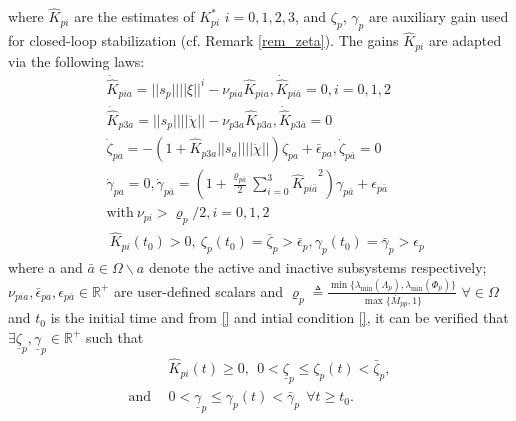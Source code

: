 \documentclass[letterpaper, 10 pt, conference]{ieeeconf}  %
\begin{document}
where $\hat{K}_{pi}$ are the estimates of $K_{pi}^*$ $i=0,1,2,3$, and $\zeta_{p}$, $\gamma_{p}$ are auxiliary gain used for closed-loop stabilization (cf. Remark \ref{rem_zeta}). The gains $\hat{K}_{pi}$ are adapted via the following laws:
\begin{subequations}\label{adaptive_law_p}
\begin{align}
&\dot{\hat{K}}_{pia} = ||s_{p}||||\xi||^i - \nu_{pia} \hat{K}_{pia}, \dot{\hat{K}}_{pi\bar{a}} = 0,  i = 0,1,2
 \\
&\dot{\hat{K}}_{p3a} =  ||s_{p}||||\ddot{\chi}|| - \nu_{p3a} \hat{K}_{p3a}, \dot{\hat{K}}_{p3\bar{a}} = 0\\
&\dot{\zeta}_{pa} = -(1 + \hat{K}_{p3a}||s_{a}||||\ddot{\chi}||)\zeta_{pa} + \bar{\epsilon}_{pa}, \dot{\zeta}_{p\bar{a}} = 0    \\ \label{zeta1}
& \dot{\gamma}_{pa} = 0,  \dot{\gamma}_{p\bar{a}} = \left(1+ \frac{\varrho_{p\bar{a}}}{2}\sum \limits_{i=0}^{3} {\hat{K}_{pi\bar{a}}}^2 \right) \gamma_{p\bar{a}} +\epsilon_{p\bar{a}} \\ 
& \text{with}~ \nu_{pi} > \varrho_{p}/2, i = 0,1,2\\
&~\hat{K}_{pi} (t_0) > 0, ~\zeta_{p} (t_0)  = \bar{\zeta}_{p} > \bar{\epsilon}_{p}, \gamma_{p} (t_0) = \bar{\gamma}_{p} > \epsilon_{p}
\end{align}
\end{subequations}
where a and $\bar{a} \in \Omega \backslash {a}$ denote the active and inactive subsystems respectively; $\nu_{pia},\bar{\epsilon}_{pa}, \epsilon_{p\bar{a}}  \in\mathbb{R}^{+}$ are user-defined scalars and $\varrho_{p} \triangleq \frac{\min \lbrace \lambda_{\min}(  \Lambda_{{p}} ), \lambda_{\min}( \Phi_{{p}} ) \rbrace}{\max \lbrace \bar{M}_{pp}, 1 \rbrace}$ $\forall  \in \Omega$ and $t_0$ is the initial time and from \ref{} and intial condition \ref{}, it can be verified that $\exists \underline{\zeta}_{p}, \underline{\gamma}_{p} \in \mathbb{R}^{+}$ such that
\begin{subequations}
\begin{align}
&\hat{K}_{pi}(t) \geq 0, ~~ 0 < \underline{\zeta}_{p} \leq \zeta_{p} (t) <  \bar{\zeta}_{p}, \nonumber \\
\text{and}~~ & 0 < \underline{\gamma}_{p} \leq \gamma_{p} (t) <  \bar{\gamma}_{p} ~~ \forall t \geq t_0.
\end{align}
\end{subequations}


\end{document}
